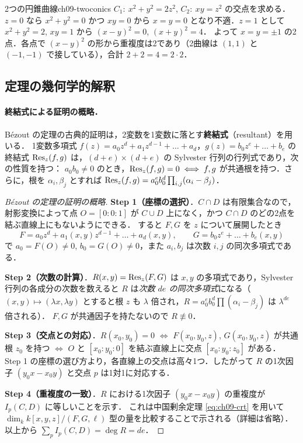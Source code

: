 \begin{myex}{2つの円錐曲線}{ch09-twoconics}
$C_1:\ x^2+y^2=2z^2$, $C_2:\ xy=z^2$ の交点を求める．
$z=0$ なら $x^2+y^2=0$ かつ $xy=0$ から $x=y=0$ となり不適．$z=1$ として $x^2+y^2=2$, $xy=1$ から $(x-y)^2=0$, $(x+y)^2=4$．
よって $x=y=\pm1$ の2点．各点で $(x-y)^2$ の形から重複度は2であり（2曲線は $(1,1)$ と $(-1,-1)$ で接している），合計 $2+2=4=2\cdot2$．
\end{myex}

\subsection{定理の幾何学的解釈}

\paragraph{終結式による証明の概略．}
B\'ezout の定理の古典的証明は，2変数を1変数に落とす\textbf{終結式}（resultant）を用いる．
1変数多項式
$f(z)=a_0z^d+a_1z^{d-1}+\dots+a_d$，$g(z)=b_0z^e+\dots+b_e$
の終結式 $\operatorname{Res}_z(f,g)$ は，$(d+e)\times(d+e)$ の Sylvester 行列の行列式であり，次の性質を持つ：
$a_0b_0\neq0$ のとき，$\operatorname{Res}_z(f,g)=0\iff f,g$ が共通根を持つ．さらに，根を $\alpha_i,\beta_j$ とすれば
$\operatorname{Res}_z(f,g)=a_0^eb_0^d\prod_{i,j}(\alpha_i-\beta_j)$．

\begin{proof}[B\'ezout の定理の証明の概略]
\textbf{Step 1（座標の選択）}．$C\cap D$ は有限集合なので，射影変換によって点 $O=[0:0:1]$ が $C\cup D$ 上になく，かつ $C\cap D$ のどの2点を結ぶ直線上にもないようにできる．
すると $F,G$ を $z$ について展開したとき
\[
  F=a_0z^d+a_1(x,y)z^{d-1}+\dots+a_d(x,y),\qquad G=b_0z^e+\dots+b_e(x,y)
\]
で $a_0=F(O)\neq0$, $b_0=G(O)\neq0$，また $a_i,b_j$ は次数 $i,j$ の同次多項式である．

\textbf{Step 2（次数の計算）}．$R(x,y)=\operatorname{Res}_z(F,G)$ は $x,y$ の多項式であり，Sylvester 行列の各成分の次数を数えると $R$ は\emph{次数 $de$ の同次多項式}になる（$(x,y)\mapsto(\lambda x,\lambda y)$ とすると根 $z$ も $\lambda$ 倍され，$R=a_0^eb_0^d\prod(\alpha_i-\beta_j)$ は $\lambda^{de}$ 倍される）．
$F,G$ が共通因子を持たないので $R\not\equiv0$．

\textbf{Step 3（交点との対応）}．$R(x_0,y_0)=0$ $\iff$ $F(x_0,y_0,z)$, $G(x_0,y_0,z)$ が共通根 $z_0$ を持つ $\iff$ $O$ と $[x_0:y_0:0]$ を結ぶ直線上に交点 $[x_0:y_0:z_0]$ がある．
Step 1 の座標の選び方より，各直線上の交点は高々1つ．したがって $R$ の1次因子 $(y_0x-x_0y)$ と交点 $p$ は1対1に対応する．

\textbf{Step 4（重複度の一致）}．$R$ における1次因子 $(y_0x-x_0y)$ の重複度が $I_p(C,D)$ に等しいことを示す．
これは中国剰余定理 \eqref{eq:ch09-crt} を用いて $\dim_k k[x,y,z]/(F,G,\ell)$ 型の量を比較することで示される（詳細は省略）．
以上から $\sum_pI_p(C,D)=\deg R=de$．
\end{proof}

